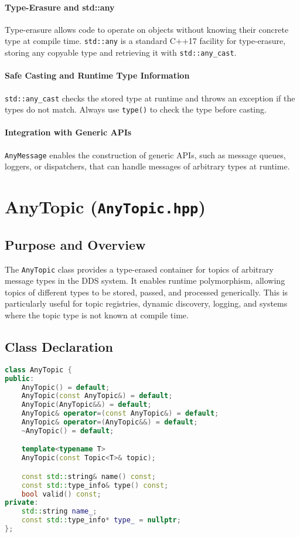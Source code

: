 \documentclass[12pt]{report}
\begin{document}
\paragraph{Type-Erasure and std::any}
Type-erasure allows code to operate on objects without knowing their concrete type at compile time. \texttt{std::any} is a standard C++17 facility for type-erasure, storing any copyable type and retrieving it with \texttt{std::any\_cast}.

\paragraph{Safe Casting and Runtime Type Information}
\texttt{std::any\_cast} checks the stored type at runtime and throws an exception if the types do not match. Always use \texttt{type()} to check the type before casting.

\paragraph{Integration with Generic APIs}
\texttt{AnyMessage} enables the construction of generic APIs, such as message queues, loggers, or dispatchers, that can handle messages of arbitrary types at runtime.

\section{AnyTopic (\texttt{AnyTopic.hpp})}

\subsection{Purpose and Overview}
The \texttt{AnyTopic} class provides a type-erased container for topics of arbitrary message types in the DDS system. It enables runtime polymorphism, allowing topics of different types to be stored, passed, and processed generically. This is particularly useful for topic registries, dynamic discovery, logging, and systems where the topic type is not known at compile time.

\subsection{Class Declaration}
\begin{lstlisting}[language=C++]
class AnyTopic {
public:
    AnyTopic() = default;
    AnyTopic(const AnyTopic&) = default;
    AnyTopic(AnyTopic&&) = default;
    AnyTopic& operator=(const AnyTopic&) = default;
    AnyTopic& operator=(AnyTopic&&) = default;
    ~AnyTopic() = default;

    template<typename T>
    AnyTopic(const Topic<T>& topic);

    const std::string& name() const;
    const std::type_info& type() const;
    bool valid() const;
private:
    std::string name_;
    const std::type_info* type_ = nullptr;
};
\end{lstlisting}
\end{document}
